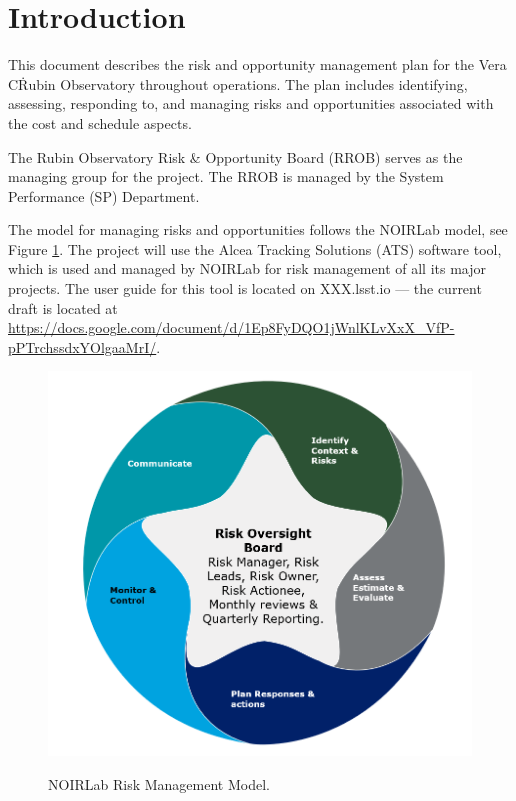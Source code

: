 \section{Introduction}

This document describes the risk and opportunity management plan for the Vera C\. Rubin Observatory throughout operations.
The plan includes identifying, assessing, responding to, and managing risks and opportunities associated with the cost and schedule aspects.

The Rubin Observatory Risk \& Opportunity Board (RROB) serves as the managing group for the project.
The RROB is managed by the System Performance (SP) Department.

The model for managing risks and opportunities follows the NOIRLab model, see Figure \ref{fig:NOIRLab-risk-model}.
The project will use the Alcea Tracking Solutions (ATS) software tool, which is used and managed by NOIRLab for risk management of all its major projects.
The user guide for this tool is located on XXX.lsst.io --- the current draft is located at \url{https://docs.google.com/document/d/1Ep8FyDQO1jWnlKLvXxX_VfP-pPTrchssdxYOlgaaMrI/}.

\begin{figure}[t]
\caption{NOIRLab Risk Management Model.}
\centering
\includegraphics[width=\textwidth]{NOIRLab-risk-model-temp}
\label{fig:NOIRLab-risk-model}
\end{figure}


